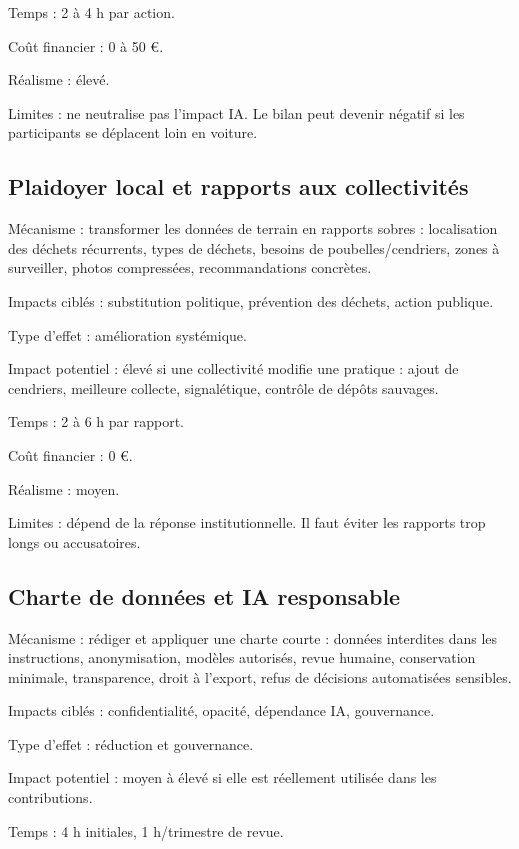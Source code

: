 \documentclass[
  10pt,
  a4paper,
  DIV=11,
  numbers=noendperiod,
  oneside]{scrreprt}
\begin{document}
Temps : 2 à 4 h par action.

Coût financier : 0 à 50 €.

Réalisme : élevé.

Limites : ne neutralise pas l'impact IA. Le bilan peut devenir négatif
si les participants se déplacent loin en voiture.

\subsection{Plaidoyer local et rapports aux
collectivités}\label{plaidoyer-local-et-rapports-aux-collectivituxe9s}

Mécanisme : transformer les données de terrain en rapports sobres :
localisation des déchets récurrents, types de déchets, besoins de
poubelles/cendriers, zones à surveiller, photos compressées,
recommandations concrètes.

Impacts ciblés : substitution politique, prévention des déchets, action
publique.

Type d'effet : amélioration systémique.

Impact potentiel : élevé si une collectivité modifie une pratique :
ajout de cendriers, meilleure collecte, signalétique, contrôle de dépôts
sauvages.

Temps : 2 à 6 h par rapport.

Coût financier : 0 €.

Réalisme : moyen.

Limites : dépend de la réponse institutionnelle. Il faut éviter les
rapports trop longs ou accusatoires.

\subsection{Charte de données et IA
responsable}\label{charte-de-donnuxe9es-et-ia-responsable}

Mécanisme : rédiger et appliquer une charte courte : données interdites
dans les instructions, anonymisation, modèles autorisés, revue humaine,
conservation minimale, transparence, droit à l'export, refus de
décisions automatisées sensibles.

Impacts ciblés : confidentialité, opacité, dépendance IA, gouvernance.

Type d'effet : réduction et gouvernance.

Impact potentiel : moyen à élevé si elle est réellement utilisée dans
les contributions.

Temps : 4 h initiales, 1 h/trimestre de revue.
\end{document}
